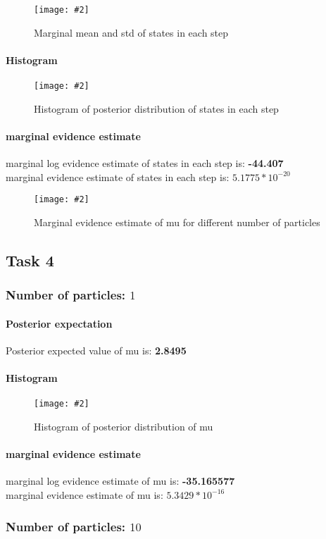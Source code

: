 \documentclass{article}
\newcommand{\centerfigcap}[3]{\begin{figure}[H]
\begin{center}\texttt{[image: \#2]} \caption{#3}\end{center}
\end{figure}}
\begin{document}
\centerfigcap{0.6}{../Figures/Mean-Std_3_5}{Marginal mean and std of states in each step}
\paragraph{Histogram}
\centerfigcap{0.7}{../Figures/Histogram_3_5}{Histogram of posterior distribution of states in each step}
\paragraph{marginal evidence estimate}
marginal log evidence estimate of states in each step is: \textbf{-44.407}\\
marginal evidence estimate of states in each step is: \textbf{$5.1775*10^{-20}$}\\

\centerfigcap{0.6}{../Figures/Evidence_3}{Marginal evidence estimate of mu for different number of particles}


\pagebreak
\subsection{Task 4}
\subsubsection{Number of particles: $1$}
\paragraph{Posterior expectation}
Posterior expected value of mu is: \textbf{2.8495}\\

\paragraph{Histogram}
\centerfigcap{0.6}{../Figures/Histogram_4_0}{Histogram of posterior distribution of mu}
\paragraph{marginal evidence estimate}
marginal log evidence estimate of mu is: \textbf{-35.165577}\\
marginal evidence estimate of mu is: \textbf{$5.3429 * 10^{-16}$}\\

\pagebreak
\subsubsection{Number of particles: $10$}
\end{document}
